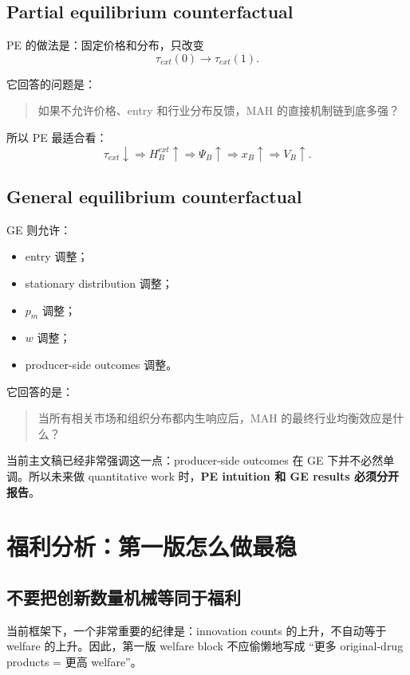 \documentclass[12pt]{ctexart}
\begin{document}
\subsection{Partial equilibrium counterfactual}

PE 的做法是：固定价格和分布，只改变
\[
\tau_{ext}(0)\to \tau_{ext}(1).
\]

它回答的问题是：
\begin{quote}
如果不允许价格、entry 和行业分布反馈，MAH 的直接机制链到底多强？
\end{quote}

所以 PE 最适合看：
\[
\tau_{ext}\downarrow
\Rightarrow H_B^{ext}\uparrow
\Rightarrow \Psi_B\uparrow
\Rightarrow x_B\uparrow
\Rightarrow V_B\uparrow.
\]

\subsection{General equilibrium counterfactual}

GE 则允许：
\begin{itemize}
    \item entry 调整；
    \item stationary distribution 调整；
    \item $p_m$ 调整；
    \item $w$ 调整；
    \item producer-side outcomes 调整。
\end{itemize}

它回答的是：
\begin{quote}
当所有相关市场和组织分布都内生响应后，MAH 的最终行业均衡效应是什么？
\end{quote}

当前主文稿已经非常强调这一点：producer-side outcomes 在 GE 下并不必然单调。所以未来做 quantitative work 时，\textbf{PE intuition 和 GE results 必须分开报告}。

\section{福利分析：第一版怎么做最稳}

\subsection{不要把创新数量机械等同于福利}

当前框架下，一个非常重要的纪律是：innovation counts 的上升，不自动等于 welfare 的上升。因此，第一版 welfare block 不应偷懒地写成 “更多 original-drug products = 更高 welfare”。
\end{document}
